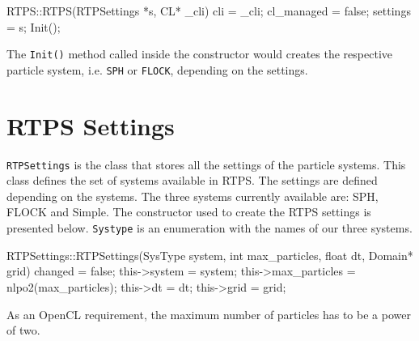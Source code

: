 
\begin{cppcode}{0}
RTPS::RTPS(RTPSettings *s, CL* _cli) 
{
	cli = _cli;
 	cl_managed = false;
	settings = s;
	Init();
}
\end{cppcode}

The \texttt{Init()} method called inside the constructor would creates the respective particle system, i.e. \texttt{SPH} or \texttt{FLOCK}, depending on the settings.

\section{RTPS Settings}\label{rtpsettings}
\texttt{RTPSettings} is the class that stores all the settings of the particle systems. This class defines the set of systems available in RTPS. The settings are defined depending on the systems. The three systems currently available are: SPH, FLOCK and Simple. The constructor used to create the RTPS  settings is presented below. \texttt{Systype} is an enumeration with the names of our three systems. 


\begin{cppcode}{0}
RTPSettings::RTPSettings(SysType system, int max_particles, float dt, Domain* grid)
{
	changed = false;
	this->system = system;
	this->max_particles = nlpo2(max_particles);
	this->dt = dt;
	this->grid = grid;
}
\end{cppcode}


As an OpenCL requirement, the maximum number of particles has to be a power of two. 

